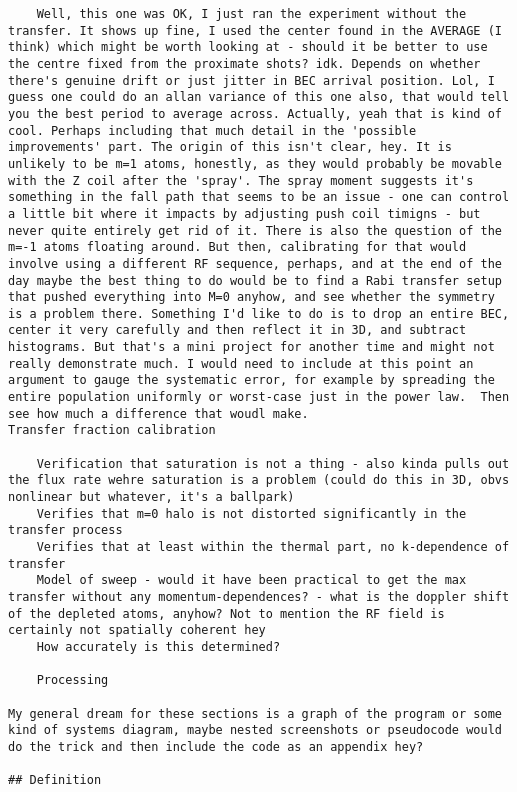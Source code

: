 \begin{verbatim}
    Well, this one was OK, I just ran the experiment without the transfer. It shows up fine, I used the center found in the AVERAGE (I think) which might be worth looking at - should it be better to use the centre fixed from the proximate shots? idk. Depends on whether there's genuine drift or just jitter in BEC arrival position. Lol, I guess one could do an allan variance of this one also, that would tell you the best period to average across. Actually, yeah that is kind of cool. Perhaps including that much detail in the 'possible improvements' part. The origin of this isn't clear, hey. It is unlikely to be m=1 atoms, honestly, as they would probably be movable with the Z coil after the 'spray'. The spray moment suggests it's something in the fall path that seems to be an issue - one can control a little bit where it impacts by adjusting push coil timigns - but never quite entirely get rid of it. There is also the question of the m=-1 atoms floating around. But then, calibrating for that would involve using a different RF sequence, perhaps, and at the end of the day maybe the best thing to do would be to find a Rabi transfer setup that pushed everything into M=0 anyhow, and see whether the symmetry is a problem there. Something I'd like to do is to drop an entire BEC, center it very carefully and then reflect it in 3D, and subtract histograms. But that's a mini project for another time and might not really demonstrate much. I would need to include at this point an argument to gauge the systematic error, for example by spreading the entire population uniformly or worst-case just in the power law.  Then see how much a difference that woudl make.
Transfer fraction calibration

    Verification that saturation is not a thing - also kinda pulls out the flux rate wehre saturation is a problem (could do this in 3D, obvs nonlinear but whatever, it's a ballpark)
    Verifies that m=0 halo is not distorted significantly in the transfer process
    Verifies that at least within the thermal part, no k-dependence of transfer
    Model of sweep - would it have been practical to get the max transfer without any momentum-dependences? - what is the doppler shift of the depleted atoms, anyhow? Not to mention the RF field is certainly not spatially coherent hey
    How accurately is this determined? 

    Processing

My general dream for these sections is a graph of the program or some kind of systems diagram, maybe nested screenshots or pseudocode would do the trick and then include the code as an appendix hey?

## Definition
\end{verbatim}

